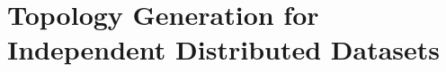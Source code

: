 \chapter{Topology Generation for Independent Distributed Datasets\label{chap:topologies}}
\localtoc








